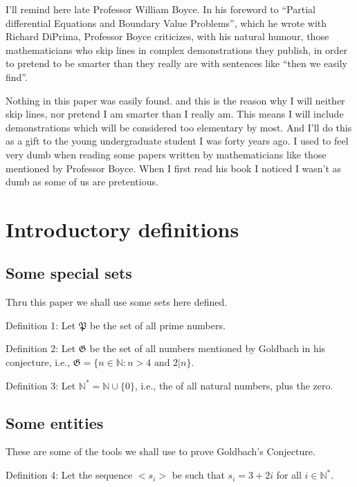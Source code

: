 \documentclass[a4paper,12pt]{article}
\begin{document}
I'll remind here late Professor William Boyce. In his foreword to ``Partial differential Equations and Boundary Value Problems'', which he wrote with Richard DiPrima, Professor Boyce criticizes, with his natural humour, those mathematicians who skip lines in complex demonstrations they publish, in order to pretend to be smarter than they really are with sentences like ``then we easily find''.

Nothing in this paper was easily found. and this is the reason why I will neither skip lines, nor pretend I am smarter than I really am. This means I will include demonstrations which will be considered too elementary by most. And I'll do this as a gift to the young undergraduate student I was forty years ago. I used to feel very dumb when reading some papers written by mathematicians like those mentioned by Professor Boyce. When I first read his book I noticed I wasn't as dumb as some of us are pretentious.

\section{Introductory definitions}

\subsection{Some special sets}

Thru this paper we shall use some sets here defined. \newline

Definition 1: Let $\mathfrak{P}$ be the set of all prime numbers.\newline

Definition 2: Let $\mathfrak{G}$ be the set of all numbers mentioned by Goldbach in his conjecture, i.e., $\mathfrak{G} = \{ n \in \mathbb{N}: n > 4 \mbox{ and } 2|n \}$. \newline

Definition 3: Let $\mathbb{N}^* = \mathbb{N} \cup \{ 0 \}$, i.e., the of all natural numbers, plus the zero.

\subsection{Some entities}
These are some of the tools we shall use to prove Goldbach's Conjecture. \newline

Definition 4: Let the sequence $<s_i>$ be such that $s_i = 3 + 2i$ for all $i \in \mathbb{N}^*$.\newline
\end{document}
